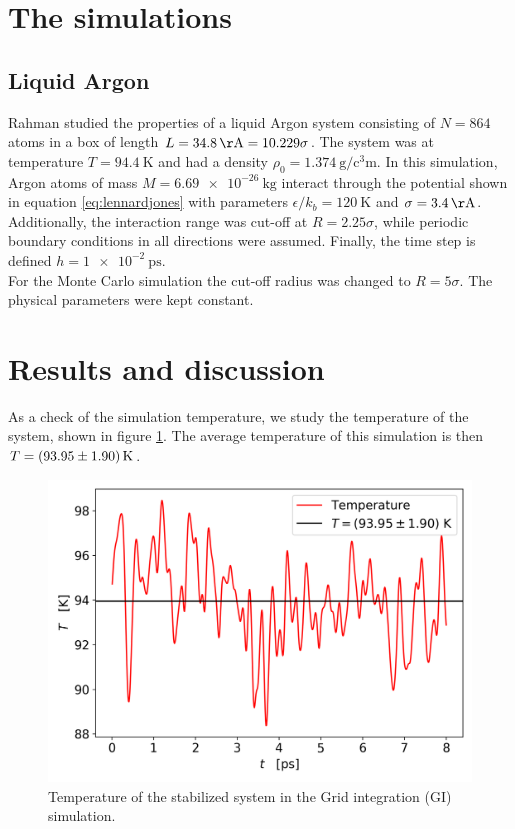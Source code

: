 \documentclass[%
aps,
pra,%
amsmath,amssymb,
preprint,%
reprint,%
notitlepage,
a4paper]{revtex4-1}
\begin{document}
\section{The simulations}
\subsection{Liquid Argon}
Rahman\cite{Rahman1964} studied the properties of a liquid Argon system consisting of $N=864$ atoms in a box of length $L = \SI{34.8}{\AA} = 10.229\sigma$. The system was at temperature $T = \SI{94.4}{\kelvin}$ and had a density $\rho_0 = \SI{1.374}{\gram\per\cubic\centi\meter}$. In this simulation, Argon atoms of mass $M = \SI{6.69e-26}{\kilogram}$ interact through the potential shown in equation \ref{eq:lennardjones} with parameters $\epsilon/k_b = \SI{120}{\kelvin}$ and $\sigma = \SI{3.4}{\AA}$. Additionally, the interaction range was cut-off at $R = 2.25\sigma$, while periodic boundary conditions in all directions were assumed. Finally, the time step is defined $h = \SI{1e-2}{\pico\second}$.\\
For the Monte Carlo simulation the cut-off radius was changed to $R = 5\sigma$. The physical parameters were kept constant.
\section{Results and discussion}
As a check of the simulation temperature, we study the temperature of the system, shown in figure \ref{fig:Tvst}. The average temperature of this simulation is then $T = \SI{93.95\pm1.90}{\kelvin}$.
\begin{figure}[t]
	\centering
	\includegraphics[width=0.9\linewidth]{../task2/results/Tvst}
	\caption{Temperature of the stabilized system in the Grid integration (GI) simulation.}
	\label{fig:Tvst}
\end{figure}
\end{document}
